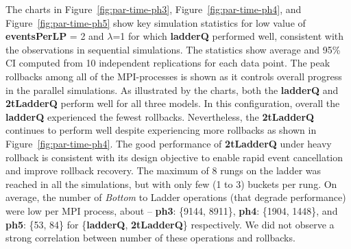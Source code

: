 The charts in Figure~\ref{fig:par-time-ph3}, Figure~\ref{fig:par-time-ph4}, and Figure~\ref{fig:par-time-ph5} show key simulation statistics for low value of \textbf{eventsPerLP} = 2 and $\lambda$=1 for
which \textbf{ladderQ} performed well, consistent with the observations in sequential simulations. The statistics show average and 95\% CI
computed from 10 independent replications for each data point. The peak rollbacks among all of the MPI-processes is shown as it controls
overall progress in the parallel simulations. As illustrated by the charts, both the \textbf{ladderQ} and
\textbf{2tLadderQ} perform well for all three models. In this configuration, overall the \textbf{ladderQ} experienced the fewest
rollbacks. Nevertheless, the \textbf{2tLadderQ} continues to perform well despite experiencing more rollbacks as shown in
Figure~\ref{fig:par-time-ph4}. The good performance of \textbf{2tLadderQ} under heavy rollback is consistent with its design objective to enable rapid event cancellation and improve rollback recovery. The maximum of 8 rungs on the ladder was reached in all the simulations, but with only few (1 to 3) buckets per rung. On average, the number of \emph{Bottom} to Ladder operations (that degrade performance) were low
per MPI process, about -- \textbf{ph3}: \{9144, 8911\}, \textbf{ph4}: \{1904, 1448\}, and \textbf{ph5}: \{53, 84\} for \{\textbf{ladderQ}, \textbf{2tLadderQ}\} respectively. We did not observe a strong correlation between number of these operations and rollbacks.

